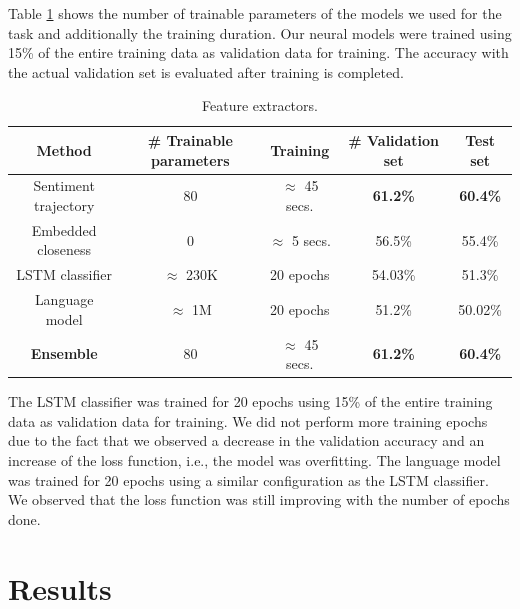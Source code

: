 \documentclass{article}
\newcommand{\lstm}{LSTM }
\begin{document}
Table \ref{tab:params} shows the number of trainable parameters of the models we
used for the task and additionally the training duration. Our neural models were
trained using 15\% of the entire training data as validation data for training.
The accuracy with the actual validation set is evaluated after training is
completed. 
\begin{table}[h!]
    \begin{center}
        \begin{tabular}{||c c c c c||} 
            \hline
            Method                 & \# Trainable parameters   & Training               & \# Validation set         & Test set \\ [0.5ex] 
            \hline\hline
            Sentiment trajectory   & 80                        & $ \approx $ 45 secs.   & \textbf{61.2\%}           & \textbf{60.4\%} \\ 
            \hline
            Embedded closeness     & 0                         & $ \approx $ 5 secs.    & 56.5\%                    & 55.4\% \\
            \hline
            LSTM classifier        & $ \approx $ 230K          & 20 epochs              & 54.03\%                   & 51.3\% \\ 
            \hline
            Language model         & $ \approx $ 1M            & 20 epochs              & 51.2\%                    & 50.02\% \\
            \hline
            \textbf{Ensemble}      & 80                        & $ \approx $ 45 secs.   & \textbf{61.2\%}           & \textbf{60.4\%} \\ [1ex] 
            \hline
        \end{tabular}    
    \end{center}
\caption{Feature extractors.}
\label{tab:params}
\end{table}
\vspace*{-0.5cm}

The \lstm classifier was trained for 20 epochs using 15\% of the entire training
data as validation data for training. We did not perform more training epochs
due to the fact that we observed a decrease in the validation accuracy and an
increase of the loss function, i.e., the model was overfitting.  The language
model was trained for 20 epochs using a similar configuration as the \lstm
classifier. We observed that the loss function was still improving with the
number of epochs done.

\section{Results}
\label{sec:results}
\end{document}

